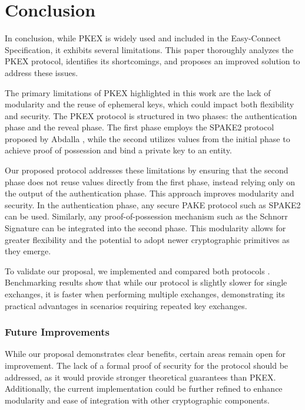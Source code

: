 \section{Conclusion}

In conclusion, while PKEX \cite{harkins-pkex-06} is widely used and included in
the Easy-Connect Specification, it exhibits several limitations. This paper
thoroughly analyzes the PKEX protocol, identifies its shortcomings, and
proposes an improved solution to address these issues.

The primary limitations of PKEX highlighted in this work are the lack of
modularity and the reuse of ephemeral keys, which could impact both flexibility
and security. The PKEX protocol is structured in two phases: the authentication
phase and the reveal phase. The first phase employs the SPAKE2 protocol
proposed by Abdalla \cite{Abdalla_2005}, while the second utilizes values from
the initial phase to achieve proof of possession and bind a private key to an
entity.

Our proposed protocol addresses these limitations by ensuring that the second
phase does not reuse values directly from the first phase, instead relying
only on the output of the authentication phase. This approach improves
modularity and security. In the authentication phase, any secure PAKE
protocol such as SPAKE2 can be used. Similarly, any proof-of-possession
mechanism such as the Schnorr Signature can be integrated into the second
phase. This modularity allows for greater flexibility and the potential to
adopt newer cryptographic primitives as they emerge.

To validate our proposal, we implemented and compared both protocols
\cite{malga_steve}. Benchmarking results show that while our protocol is
slightly slower for single exchanges, it is faster when performing multiple
exchanges, demonstrating its practical advantages in scenarios requiring
repeated key exchanges.

\subsubsection{Future Improvements}

While our proposal demonstrates clear benefits, certain areas remain open for
improvement. The lack of a formal proof of security for the protocol should be
addressed, as it would provide stronger theoretical guarantees than PKEX.
Additionally, the current implementation could be further refined to enhance
modularity and ease of integration with other cryptographic components.
